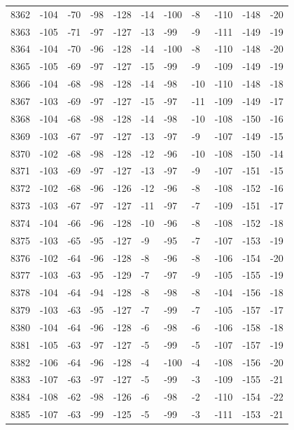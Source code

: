\begin{table}[H]
\begin{tabular}{lllllllllll}
8362 & -104 & -70 & -98 & -128 & -14 & -100 & -8 & -110 & -148 & -20 \\
8363 & -105 & -71 & -97 & -127 & -13 & -99 & -9 & -111 & -149 & -19 \\
8364 & -104 & -70 & -96 & -128 & -14 & -100 & -8 & -110 & -148 & -20 \\
8365 & -105 & -69 & -97 & -127 & -15 & -99 & -9 & -109 & -149 & -19 \\
8366 & -104 & -68 & -98 & -128 & -14 & -98 & -10 & -110 & -148 & -18 \\
8367 & -103 & -69 & -97 & -127 & -15 & -97 & -11 & -109 & -149 & -17 \\
8368 & -104 & -68 & -98 & -128 & -14 & -98 & -10 & -108 & -150 & -16 \\
8369 & -103 & -67 & -97 & -127 & -13 & -97 & -9 & -107 & -149 & -15 \\
8370 & -102 & -68 & -98 & -128 & -12 & -96 & -10 & -108 & -150 & -14 \\
8371 & -103 & -69 & -97 & -127 & -13 & -97 & -9 & -107 & -151 & -15 \\
8372 & -102 & -68 & -96 & -126 & -12 & -96 & -8 & -108 & -152 & -16 \\
8373 & -103 & -67 & -97 & -127 & -11 & -97 & -7 & -109 & -151 & -17 \\
8374 & -104 & -66 & -96 & -128 & -10 & -96 & -8 & -108 & -152 & -18 \\
8375 & -103 & -65 & -95 & -127 & -9 & -95 & -7 & -107 & -153 & -19 \\
8376 & -102 & -64 & -96 & -128 & -8 & -96 & -8 & -106 & -154 & -20 \\
8377 & -103 & -63 & -95 & -129 & -7 & -97 & -9 & -105 & -155 & -19 \\
8378 & -104 & -64 & -94 & -128 & -8 & -98 & -8 & -104 & -156 & -18 \\
8379 & -103 & -63 & -95 & -127 & -7 & -99 & -7 & -105 & -157 & -17 \\
8380 & -104 & -64 & -96 & -128 & -6 & -98 & -6 & -106 & -158 & -18 \\
8381 & -105 & -63 & -97 & -127 & -5 & -99 & -5 & -107 & -157 & -19 \\
8382 & -106 & -64 & -96 & -128 & -4 & -100 & -4 & -108 & -156 & -20 \\
8383 & -107 & -63 & -97 & -127 & -5 & -99 & -3 & -109 & -155 & -21 \\
8384 & -108 & -62 & -98 & -126 & -6 & -98 & -2 & -110 & -154 & -22 \\
8385 & -107 & -63 & -99 & -125 & -5 & -99 & -3 & -111 & -153 & -21 \\

\end{tabular}
\end{table}
